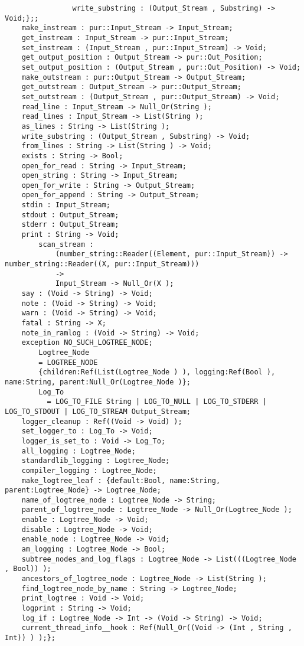 \begin{verbatim}
                write_substring : (Output_Stream , Substring) -> Void;};;
    make_instream : pur::Input_Stream -> Input_Stream;
    get_instream : Input_Stream -> pur::Input_Stream;
    set_instream : (Input_Stream , pur::Input_Stream) -> Void;
    get_output_position : Output_Stream -> pur::Out_Position;
    set_output_position : (Output_Stream , pur::Out_Position) -> Void;
    make_outstream : pur::Output_Stream -> Output_Stream;
    get_outstream : Output_Stream -> pur::Output_Stream;
    set_outstream : (Output_Stream , pur::Output_Stream) -> Void;
    read_line : Input_Stream -> Null_Or(String );
    read_lines : Input_Stream -> List(String );
    as_lines : String -> List(String );
    write_substring : (Output_Stream , Substring) -> Void;
    from_lines : String -> List(String ) -> Void;
    exists : String -> Bool;
    open_for_read : String -> Input_Stream;
    open_string : String -> Input_Stream;
    open_for_write : String -> Output_Stream;
    open_for_append : String -> Output_Stream;
    stdin : Input_Stream;
    stdout : Output_Stream;
    stderr : Output_Stream;
    print : String -> Void;
        scan_stream :
            (number_string::Reader((Element, pur::Input_Stream)) -> number_string::Reader((X, pur::Input_Stream)))
            ->
            Input_Stream -> Null_Or(X );
    say : (Void -> String) -> Void;
    note : (Void -> String) -> Void;
    warn : (Void -> String) -> Void;
    fatal : String -> X;
    note_in_ramlog : (Void -> String) -> Void;
    exception NO_SUCH_LOGTREE_NODE;
        Logtree_Node
        = LOGTREE_NODE
        {children:Ref(List(Logtree_Node ) ), logging:Ref(Bool ), name:String, parent:Null_Or(Logtree_Node )};
        Log_To
          = LOG_TO_FILE String | LOG_TO_NULL | LOG_TO_STDERR | LOG_TO_STDOUT | LOG_TO_STREAM Output_Stream;
    logger_cleanup : Ref((Void -> Void) );
    set_logger_to : Log_To -> Void;
    logger_is_set_to : Void -> Log_To;
    all_logging : Logtree_Node;
    standardlib_logging : Logtree_Node;
    compiler_logging : Logtree_Node;
    make_logtree_leaf : {default:Bool, name:String, parent:Logtree_Node} -> Logtree_Node;
    name_of_logtree_node : Logtree_Node -> String;
    parent_of_logtree_node : Logtree_Node -> Null_Or(Logtree_Node );
    enable : Logtree_Node -> Void;
    disable : Logtree_Node -> Void;
    enable_node : Logtree_Node -> Void;
    am_logging : Logtree_Node -> Bool;
    subtree_nodes_and_log_flags : Logtree_Node -> List(((Logtree_Node , Bool)) );
    ancestors_of_logtree_node : Logtree_Node -> List(String );
    find_logtree_node_by_name : String -> Logtree_Node;
    print_logtree : Void -> Void;
    logprint : String -> Void;
    log_if : Logtree_Node -> Int -> (Void -> String) -> Void;
    current_thread_info__hook : Ref(Null_Or((Void -> (Int , String , Int)) ) );};
\end{verbatim}
